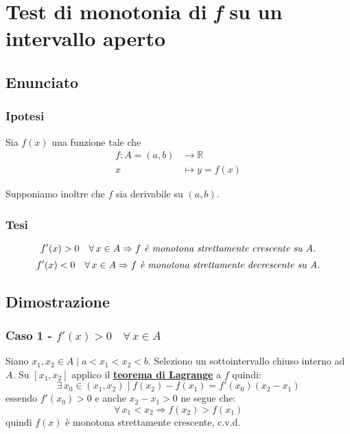 \documentclass[../../dimostrazioni]{subfiles}
\begin{document}
    \chapter{Test di monotonia di \emph{f} su un intervallo aperto}

        \section*{Enunciato}

        \subsection*{Ipotesi}

            Sia \(f(x)\) una funzione tale che
            \begin{align*}
                f : A = (a, b) &\longrightarrow \mathbb{R}\\
                x &\longmapsto y = f(x) 
            \end{align*}

            Supponiamo inoltre che \(f\) sia derivabile su \((a, b)\).

        \subsection*{Tesi}

            \[ f'(x) > 0 \quad \forall \, x \in A \Rightarrow f \text{\emph{ è monotona strettamente crescente su A.}}\]
            \[ f'(x) < 0 \quad \forall \, x \in A \Rightarrow f \text{\emph{ è monotona strettamente decrescente su A.}}\]

        \section*{Dimostrazione}

            \medskip

            \subsection*{Caso 1 - \( f'(x) > 0 \quad \forall \, x \in A \)}

            Siano \(x_1, x_2 \in A \mid a < x_1 < x_2 < b \). Seleziono un sottointervallo chiuso interno ad \(A\).
            Su \( [x_1, x_2] \) applico il \textbf{\hyperref[teoLagrange]{teorema di Lagrange}} a \(f\) quindi:
            \[
                \exists \, x_0 \in (x_1, x_2) \mid f(x_2) - f(x_1) = f'(x_0)(x_2 - x_1) 
            \]
            essendo \( f'(x_0) > 0 \) e anche \( x_2 - x_1 > 0 \) ne segue che:
            \[
                \forall \, x_1 < x_2 \Rightarrow f(x_2) > f(x_1)
            \]
            quindi \(f(x)\) è monotona strettamente crescente, c.v.d.
\end{document}
